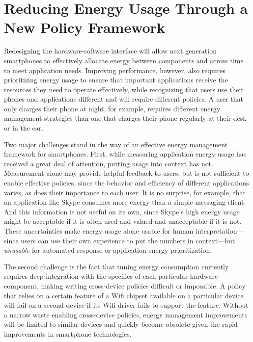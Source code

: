 \section{Reducing Energy Usage Through a New Policy Framework}
\label{sec-reduce}

Redesigning the hardware-software interface will allow next generation
smartphones to effectively allocate energy between components and across time
to meet application needs. Improving performance, however, also requires
prioritizing energy usage to ensure that important applications receive the
resources they need to operate effectively, while recognizing that users use
their phones and applications different and will require different policies.
A user that only charges their phone at night, for example, requires
different energy management strategies than one that charges their phone
regularly at their desk or in the car.

Two major challenges stand in the way of an effective energy management
framework for smartphones. First, while measuring application energy usage
has received a great deal of attention, putting usage into context has not.
Measurement alone may provide helpful feedback to users, but is not
sufficient to enable effective policies, since the behavior and efficiency of
different applications varies, as does their importance to each user. It is
no surprise, for example, that an application like Skype consumes more energy
than a simple messaging client. And this information is not useful on its
own, since Skype's high energy usage might be acceptable if it is often used
and valued and unacceptable if it is not. These uncertainties make energy
usage alone usable for human interpretation---since users can use their own
experience to put the numbers in context---but \textit{unusable} for
automated response or application energy prioritization.

The second challenge is the fact that tuning energy consumption currently
requires deep integration with the specifics of each particular hardware
component, making writing cross-device policies difficult or impossible. A
policy that relies on a certain feature of a Wifi chipset available on a
particular device will fail on a second device if its Wifi driver fails to
support the feature. Without a narrow waste enabling cross-device policies,
energy management improvements will be limited to similar devices and quickly
become obsolete given the rapid improvements in smartphone technologies.

